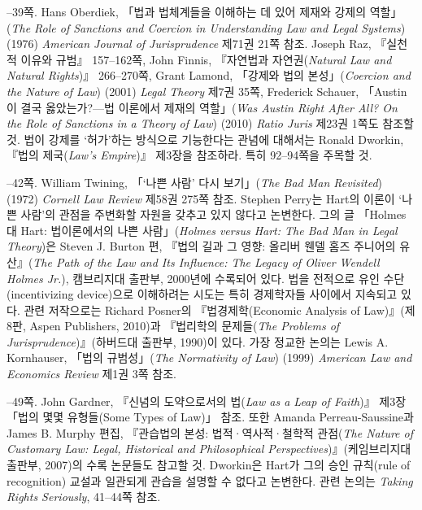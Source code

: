 {--39쪽.  Hans Oberdiek, 「법과 법체계들을 이해하는 데 있어
제재와 강제의 역할」(\emph{The Role of Sanctions and Coercion in
Understanding Law and Legal Systems}) (1976) \emph{American Journal of
Jurisprudence} 제71권 21쪽 참조. Joseph Raz, 『실천적 이유와 규범』
157--162쪽, John Finnis, 『자연법과 자연권(\emph{Natural Law and Natural
Rights})』 266--270쪽, Grant Lamond, 「강제와 법의 본성」(\emph{Coercion
and the Nature of Law}) (2001) \emph{Legal Theory} 제7권 35쪽, Frederick
Schauer, 「Austin이 결국 옳았는가?---법 이론에서 제재의 역할」(\emph{Was
Austin Right After All? On the Role of Sanctions in a Theory of Law})
(2010) \emph{Ratio Juris} 제23권 1쪽도 참조할 것. 법이 강제를 ‘허가’하는
방식으로 기능한다는 관념에 대해서는 Ronald Dworkin, 『법의
제국(\emph{Law's Empire})』 제3장을 참조하라. 특히 92--94쪽을 주목할 것.

--42쪽.  William Twining, 「‘나쁜 사람’ 다시 보기」(\emph{The Bad Man Revisited})
(1972) \emph{Cornell Law Review} 제58권 275쪽 참조. Stephen Perry는
Hart의 이론이 ‘나쁜 사람’의 관점을 주변화할 자원을 갖추고 있지 않다고
논변한다. 그의 글 「Holmes 대 Hart: 법이론에서의 나쁜
사람」(\emph{Holmes versus Hart: The Bad Man in Legal Theory})은 Steven
J. Burton 편, 『법의 길과 그 영향: 올리버 웬델 홈즈 주니어의
유산』(\emph{The Path of the Law and Its Influence: The Legacy of Oliver
Wendell Holmes Jr.}), 캠브리지대 출판부, 2000년에 수록되어 있다. 법을
전적으로 유인 수단(incentivizing device)으로 이해하려는 시도는 특히
경제학자들 사이에서 지속되고 있다. 관련 저작으로는 Richard Posner의
『법경제학(Economic Analysis of Law)』(제8판, Aspen Publishers, 2010)과
『법리학의 문제들(\emph{The Problems of Jurisprudence})』(하버드대
출판부, 1990)이 있다. 가장 정교한 논의는 Lewis A. Kornhauser, 「법의
규범성」(\emph{The Normativity of Law}) (1999) \emph{American Law and
Economics Review} 제1권 3쪽 참조.

--49쪽.  John
Gardner, 『신념의 도약으로서의 법(\emph{Law as a Leap of Faith})』 제3장
「법의 몇몇 유형들(Some Types of Law)」 참조. 또한 Amanda
Perreau-Saussine과 James B. Murphy 편집, 『관습법의 본성:
법적·역사적·철학적 관점(\emph{The Nature of Customary Law: Legal,
Historical and Philosophical Perspectives})』(케임브리지대 출판부,
2007)의 수록 논문들도 참고할 것. Dworkin은 Hart가 그의 승인 규칙(rule of
recognition) 교설과 일관되게 관습을 설명할 수 없다고 논변한다. 관련
논의는 \emph{Taking Rights Seriously}, 41--44쪽 참조.
}
